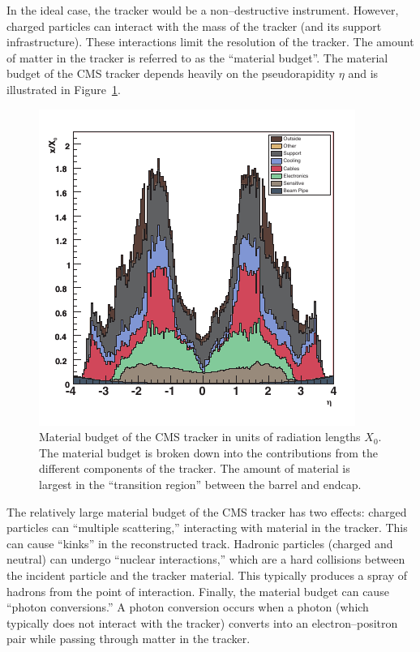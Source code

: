 In the ideal case, the tracker would be a non--destructive instrument.  However,
charged particles can interact with the mass of the tracker (and its support
infrastructure).  These interactions limit the resolution of the tracker.  The
amount of matter in the tracker is referred to as the ``material budget''.  The
material budget of the CMS tracker depends heavily on the pseudorapidity $\eta$
and is illustrated in Figure~\ref{fig:TrackerMaterialBudget}.
\begin{figure}
  \centering
  \includegraphics[]{detector_chapter/figures/tracker_material_budget_cleaned.pdf}
  \caption[Material budget of the CMS tracker]{Material budget of the CMS
  tracker in units of radiation lengths $X_0$.  The material budget is broken down
  into the contributions from the different components of the tracker.  The
  amount of material is largest in the ``transition region'' between the barrel
  and endcap.  } \label{fig:TrackerMaterialBudget}
\end{figure}
The relatively large material budget of the CMS tracker has two effects: charged
particles can ``multiple scattering,'' interacting with material in the
tracker.  This can cause ``kinks'' in the reconstructed track.   Hadronic
particles (charged and neutral) can undergo ``nuclear interactions,'' which are
a hard collisions between the incident particle and the tracker material. This
typically produces a spray of hadrons from the point of interaction.  Finally,
the material budget can cause ``photon conversions.''  A photon conversion
occurs when a photon (which typically does not interact with the tracker)
converts into an electron--positron pair while passing through matter in the
tracker.  



